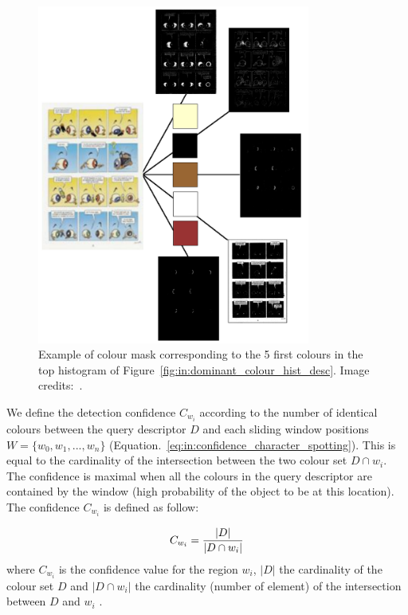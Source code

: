  \begin{figure}[!ht]  %
   \centering
  \includegraphics[width=0.8\textwidth]{masks.png}
  \caption[Colour mask corresponding to five colour of the query descriptor]{Example of colour mask corresponding to the 5 first colours in the top histogram of Figure~\ref{fig:in:dominant_colour_hist_desc}. Image credits:~\cite{Noeils11}.}
  \label{fig:in:masks}
 \end{figure}


We define the detection confidence $C_{w_i}$ according to the number of identical colours between the query descriptor $D$ and each sliding window positions $W=\{w_0,w_1,...,w_n\}$ (Equation.~\ref{eq:in:confidence_character_spotting}).
This is equal to the cardinality of the intersection between the two colour set $D \cap w_i$. The confidence is maximal when all the colours in the query descriptor are contained by the window (high probability of the object to be at this location).
The confidence $C_{w_i}$ is defined as follow:

\begin{equation}\label{eq:in:confidence_character_spotting}
   C_{w_i} = \frac{|D|}{|D \cap w_i|}\\
 \end{equation}
where $C_{w_i}$ is the confidence value for the region $w_i$, $|D|$ the cardinality of the colour set $D$ and $|D \cap w_i|$ the cardinality (number of element) of the intersection between $D$ and $w_i$ .

